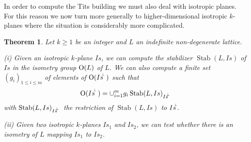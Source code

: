 \documentclass[a4paper,11pt]{article}
\newtheorem{theorem}[lemma]{Theorem}
\newcommand{\Orth}{\mathop{\null\mathrm {O}}\nolimits}
\newcommand{\Stab}{\mathop{\mathrm {Stab}}\nolimits}
\newcommand{\shiftleft}[2]{\makebox[0pt][r]{\makebox[#1][l]{#2}}}
\newcommand{\Isperp}{Is^{\shiftleft{3pt}{\raisebox{2pt}{$\mathsmaller{\mathsmaller{\perp}}$}}}\hspace{4pt}}
\newcommand{\IsperpB}{Is^{\shiftleft{3pt}{\raisebox{2pt}{$\mathsmaller{\mathsmaller{\perp}}$}}}}
\begin{document}
In order to compute the Tits building we must also deal with isotropic planes. For this reason we now
turn more generally to higher-dimensional isotropic $k$-planes where the situation is considerably more
complicated.
\begin{theorem}\label{theorem_isotropic_k_planes}
Let $k \geq 1$ be an integer and $L$ an indefinite non-degenerate lattice.

(i) Given an isotropic $k$-plane $Is$, we can compute the stabilizer $\Stab(L,Is)$ of $Is$ in the isometry group $\Orth(L)$
of $L$. We can also compute a finite set $(g_i)_{1\leq i\leq m}$ of elements of $\Orth(\Isperp)$ such that
\begin{equation*}
\Orth(\Isperp) = \cup_{i=1}^m g_i \Stab(L,Is)_{\Isperp}
\end{equation*}
with $\Stab(L,Is)_{\Isperp}$ the restriction of $\Stab(L,Is)$ to $\IsperpB$.

(ii) Given two isotropic $k$-planes $Is_1$ and $Is_2$, we can test whether there is an isometry of $L$ mapping $Is_1$ to $Is_2$.
\end{theorem}
\end{document}
